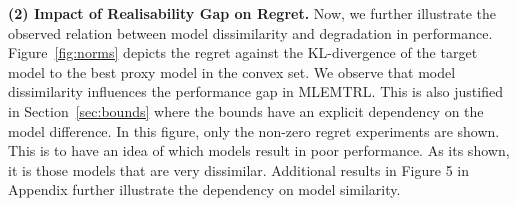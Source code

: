 
\noindent\textbf{(2) Impact of Realisability Gap on Regret.} Now, we further illustrate the observed relation between model dissimilarity and degradation in performance. Figure~\ref{fig:norms} depicts the regret against the KL-divergence of the target model to the best proxy model in the convex set. We observe that model dissimilarity influences the performance gap in MLEMTRL. This is also justified in Section~\ref{sec:bounds} where the bounds have an explicit dependency on the model difference. In this figure, only the non-zero regret experiments are shown. This is to have an idea of which models result in poor performance. As its shown, it is those models that are very dissimilar. Additional results in %
Figure 5 in Appendix further illustrate the dependency on model similarity.

